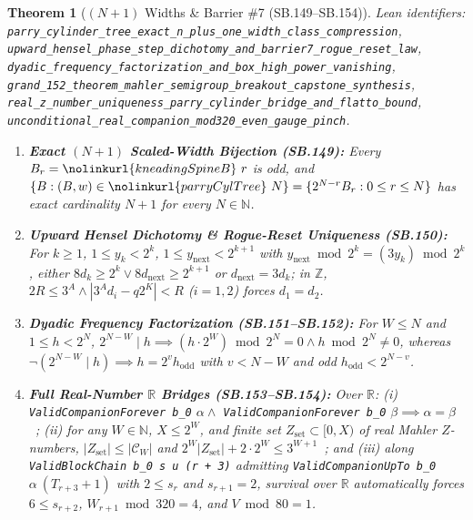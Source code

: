 \documentclass[11pt]{article}
\newtheorem{theorem}{Theorem}[section]
\begin{document}
\begin{theorem}[$(N+1)$ Widths \& Barrier \#7 (SB.149--SB.154)]
\emph{Lean identifiers:} \nolinkurl{parry_cylinder_tree_exact_n_plus_one_width_class_compression}, \nolinkurl{upward_hensel_phase_step_dichotomy_and_barrier7_rogue_reset_law}, \nolinkurl{dyadic_frequency_factorization_and_box_high_power_vanishing}, \nolinkurl{grand_152_theorem_mahler_semigroup_breakout_capstone_synthesis}, \nolinkurl{real_z_number_uniqueness_parry_cylinder_bridge_and_flatto_bound}, \nolinkurl{unconditional_real_companion_mod320_even_gauge_pinch}.
\begin{enumerate}
  \item \textbf{Exact $(N+1)$ Scaled-Width Bijection (SB.149):} Every $B_r = \nolinkurl{kneadingSpineB}\ r$ is odd, and $\{B : (B, w) \in \nolinkurl{parryCylTree}\ N\} = \{2^{N-r} B_r : 0 \le r \le N\}$ has exact cardinality $N + 1$ for every $N \in \mathbb{N}$.
  \item \textbf{Upward Hensel Dichotomy \& Rogue-Reset Uniqueness (SB.150):} For $k \ge 1$, $1 \le y_k < 2^k$, $1 \le y_{\text{next}} < 2^{k+1}$ with $y_{\text{next}} \bmod 2^k = (3 y_k) \bmod 2^k$, either $8 d_k \ge 2^k \vee 8 d_{\text{next}} \ge 2^{k+1}$ or $d_{\text{next}} = 3 d_k$; in $\mathbb{Z}$, $2 R \le 3^A \wedge |3^A d_i - q 2^K| < R$ ($i = 1, 2$) forces $d_1 = d_2$.
  \item \textbf{Dyadic Frequency Factorization (SB.151--SB.152):} For $W \le N$ and $1 \le h < 2^N$, $2^{N-W} \mid h \implies (h \cdot 2^W) \bmod 2^N = 0 \wedge h \bmod 2^N \ne 0$, whereas $\neg(2^{N-W} \mid h) \implies h = 2^v h_{\text{odd}}$ with $v < N - W$ and odd $h_{\text{odd}} < 2^{N-v}$.
  \item \textbf{Full Real-Number $\mathbb{R}$ Bridges (SB.153--SB.154):} Over $\mathbb{R}$: (i) \texttt{ValidCompanionForever b\_0} $\alpha \wedge$ \texttt{ValidCompanionForever b\_0} $\beta \implies \alpha = \beta$~\cite{Mahler1968}; (ii) for any $W \in \mathbb{N}$, $X \le 2^W$, and finite set $Z_{\text{set}} \subset [0, X)$ of real Mahler $Z$-numbers, $|Z_{\text{set}}| \le |\mathcal{C}_W|$ and $2^W |Z_{\text{set}}| + 2 \cdot 2^W \le 3^{W+1}$~\cite{Flatto1992,FLP1995}; and (iii) along \texttt{ValidBlockChain b\_0 s u (r + 3)} admitting \texttt{ValidCompanionUpTo b\_0} $\alpha\ (T_{r+3} + 1)$ with $2 \le s_r$ and $s_{r+1} = 2$, survival over $\mathbb{R}$ automatically forces $6 \le s_{r+2}$, $W_{r+1} \bmod 320 = 4$, and $V \bmod 80 = 1$.
\end{enumerate}
\end{theorem}
\end{document}
